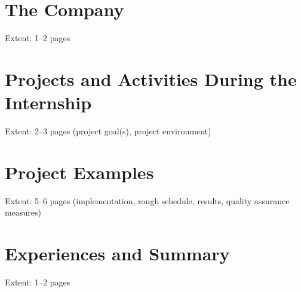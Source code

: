 \documentclass[type=internship,theme=default,language=english,titlelanguage=english,smartquotes=true,aiusage=detailed]{hgbthesis}
\begin{document}
\mainmatter                                    %

\chapter{The Company}

Extent: 1--2 pages


\chapter{Projects and Activities During the Internship}

Extent: 2--3 pages (project goal(s), project environment)

     
\chapter{Project Examples}

Extent: 5--6 pages (implementation, rough schedule, results, quality assurance measures)


\chapter{Experiences and Summary}

Extent: 1--2 pages


\end{document}
